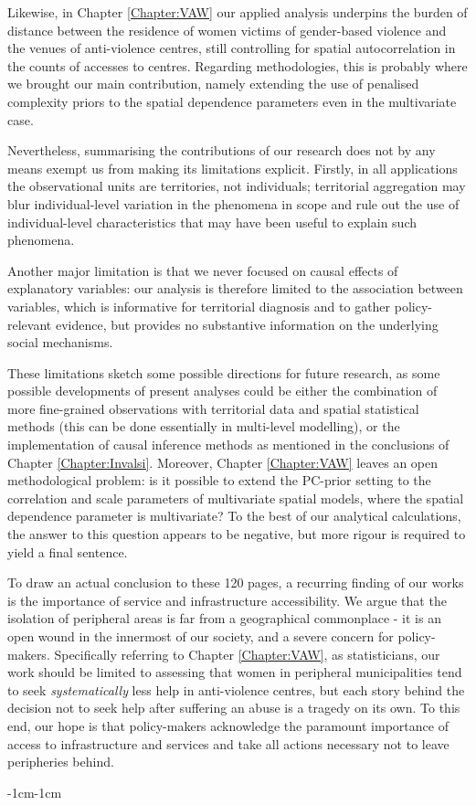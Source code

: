 \documentclass[openany, 11pt, oneside]{book}
\begin{document}
Likewise, in Chapter \ref{Chapter:VAW} our applied analysis underpins the burden of distance between the residence of women victims of gender-based violence and the venues of anti-violence centres, still controlling for spatial autocorrelation in the counts of accesses to centres. Regarding methodologies, this is probably where we brought our main contribution, namely extending the use of penalised complexity priors to the spatial dependence parameters even in the multivariate case. 

Nevertheless, summarising the contributions of our research does not by any means exempt us from making its limitations explicit.  Firstly, in all applications the observational units are territories, not individuals; territorial aggregation may blur individual-level variation in the phenomena in scope and rule out the use of individual-level characteristics that may have been useful to explain such phenomena.

Another major limitation is that we never focused on causal effects of explanatory variables: our analysis is therefore limited to the association between variables, which is informative for territorial diagnosis and to gather policy-relevant evidence, but provides no substantive information on the underlying social mechanisms. 

 These limitations sketch some possible directions for future research, as some possible developments of present analyses could be either the combination of more fine-grained observations with territorial data and spatial statistical methods (this can be done essentially in multi-level modelling), or the implementation of causal inference methods as mentioned in the conclusions of Chapter \ref{Chapter:Invalsi}. Moreover, Chapter \ref{Chapter:VAW} leaves an open methodological problem: is it possible to extend the PC-prior setting to the correlation and scale parameters of multivariate spatial models, where the spatial dependence parameter is multivariate? To the best of our analytical calculations, the answer to this question appears to be negative, but more rigour is required to yield a final sentence.

 To draw an actual conclusion to these 120 pages, a recurring finding of our works is the importance of service and infrastructure accessibility. We argue that the isolation of peripheral areas is far from a geographical commonplace - it is an open wound in the innermost of our society, and a severe concern for policy-makers. Specifically referring to Chapter \ref{Chapter:VAW}, as statisticians, our work should be limited to assessing that women in peripheral municipalities tend to seek \textit{systematically} less help in anti-violence centres, but each story behind the decision not to seek help after suffering an abuse is a tragedy on its own. To this end, our hope is that policy-makers acknowledge the paramount importance of access to infrastructure and services and take all actions necessary not to leave peripheries behind.
%
%
\begingroup
\begin{adjustwidth}{-1cm}{-1cm} %
\printbibliography
\end{adjustwidth}
\endgroup
%
%
 
\end{document}
